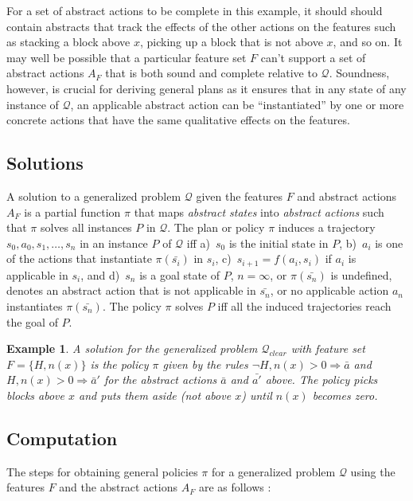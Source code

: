 \documentclass[letterpaper]{article} %
\newtheorem{example}[definition]{Example}
\newcommand{\Q}{\mathcal{Q}}
\newcommand{\Rule}[2]{\ensuremath{#1 \Rightarrow #2}}
\begin{document}
For a set of abstract actions to be complete in this example, it should 
should contain  abstracts that track the  effects of the other  actions
on the features such as stacking a block above $x$, picking up a block that is not above $x$, and so on.
It may well be possible that a particular feature set $F$ can't support a set of abstract actions
$A_F$ that is both sound and complete relative to  $\Q$. Soundness, however,  is crucial for deriving general plans as it ensures
that in any state of any instance of $\Q$,  an applicable  abstract action  can be ``instantiated'' 
by   one or more concrete actions that have the same qualitative effects on the features. 

\subsection{Solutions}

A solution to a  generalized problem $\Q$ given the  features $F$ and  abstract actions $A_F$
is a partial  function $\pi$ that maps \emph{abstract states} into \emph{abstract actions} such that
$\pi$ solves all instances $P$ in $\Q$. The plan or policy $\pi$ induces a  trajectory $s_0,a_0,s_1, \ldots, s_n$ in an instance $P$ of $\Q$
iff a)~$s_0$ is the initial state in $P$, b)~$a_i$ is one of the actions that instantiate 
$\pi(\bar{s_i})$ in $s_i$, c)~$s_{i+1}=f(a_i,s_i)$ if $a_i$ is applicable in $s_i$,
and d)~$s_n$ is a goal  state of $P$,  $n=\infty$, or $\pi(\bar{s_n})$ is undefined, denotes an abstract action
that is not applicable in $\bar{s_n}$, or no applicable action $a_n$ instantiates  $\pi(\bar{s_n})$.
The policy $\pi$ solves $P$ iff all the induced trajectories reach the goal of $P$.

\begin{example}
A solution for the generalized problem $\Q_{clear}$  with feature set $F=\{H,n(x)\}$
is the policy $\pi$  given by the rules $\Rule{\neg H, n(x)>0}{\bar{a}}$ and $\Rule{H, n(x)>0}{\bar{a}'}$
for the abstract actions $\bar{a}$ and $\bar{a'}$ above. The policy picks blocks above $x$ and puts them aside
(not above $x$) until $n(x)$ becomes zero.
\end{example}

\subsection{Computation}

The steps for obtaining general policies $\pi$ for a generalized problem $\Q$
using the features $F$ and the  abstract actions $A_F$ are as follows \cite{bonet:ijcai2018}:
\end{document}
